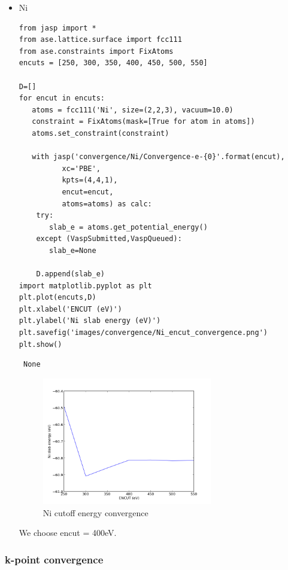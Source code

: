 \documentclass[11pt]{article}
\begin{document}
\begin{itemize}
\item Ni\\
\label{sec-3-2-1-2}%
\begin{verbatim}
from jasp import *
from ase.lattice.surface import fcc111
from ase.constraints import FixAtoms
encuts = [250, 300, 350, 400, 450, 500, 550]

D=[]
for encut in encuts:
   atoms = fcc111('Ni', size=(2,2,3), vacuum=10.0)
   constraint = FixAtoms(mask=[True for atom in atoms])
   atoms.set_constraint(constraint)

   with jasp('convergence/Ni/Convergence-e-{0}'.format(encut),
          xc='PBE',
          kpts=(4,4,1),
          encut=encut,
          atoms=atoms) as calc:
    try:
       slab_e = atoms.get_potential_energy()
    except (VaspSubmitted,VaspQueued):
       slab_e=None

    D.append(slab_e)
import matplotlib.pyplot as plt
plt.plot(encuts,D)
plt.xlabel('ENCUT (eV)')
plt.ylabel('Ni slab energy (eV)')
plt.savefig('images/convergence/Ni_encut_convergence.png')
plt.show()
\end{verbatim}

\begin{verbatim}
 None
\end{verbatim}
\begin{figure}[H]
\centering
\includegraphics[width=0.7\textwidth]{./images/convergence/Ni_encut_convergence.png}
\caption{Ni cutoff energy convergence}
\end{figure}

We choose encut = 400eV.

\end{itemize} %
\subsubsection{k-point convergence}
\label{sec-3-2-2}
\end{document}
